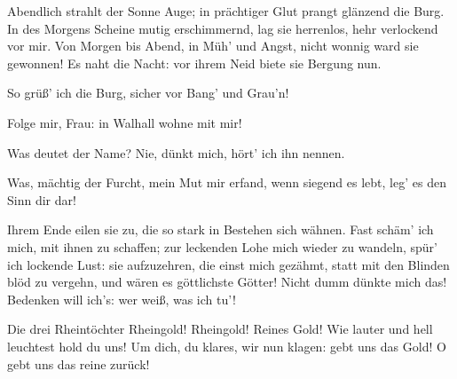 \begin{drama}


\Wotanspeaks
Abendlich strahlt der Sonne Auge;
in prächtiger Glut prangt glänzend die Burg.
In des Morgens Scheine mutig erschimmernd,
lag sie herrenlos, hehr verlockend vor mir.
Von Morgen bis Abend, in Müh' und Angst,
nicht wonnig ward sie gewonnen!
Es naht die Nacht: vor ihrem Neid
biete sie Bergung nun.
 



So grüß' ich die Burg,
sicher vor Bang' und Grau'n!
 



Folge mir, Frau:
in Walhall wohne mit mir!
 

\Frickaspeaks
Was deutet der Name?
Nie, dünkt mich, hört' ich ihn nennen.
 

\Wotanspeaks
Was, mächtig der Furcht,
mein Mut mir erfand,
wenn siegend es lebt,
leg' es den Sinn dir dar!
 




\Logespeaks


Ihrem Ende eilen sie zu,
die so stark in Bestehen sich wähnen.
Fast schäm' ich mich, mit ihnen zu schaffen;
zur leckenden Lohe mich wieder zu wandeln,
spür' ich lockende Lust:
sie aufzuzehren, die einst mich gezähmt,
statt mit den Blinden blöd zu vergehn,
und wären es göttlichste Götter!
Nicht dumm dünkte mich das!
Bedenken will ich's: wer weiß, was ich tu'!
 




Die drei Rheintöchter
Rheingold! Rheingold! Reines Gold!
Wie lauter und hell leuchtest hold du uns!
Um dich, du klares, wir nun klagen:
gebt uns das Gold!
O gebt uns das reine zurück!
 

\Wotanspeaks



\end{drama}
